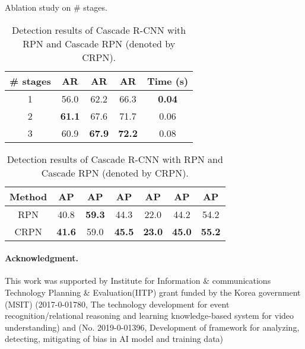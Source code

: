 \documentclass{article}
\begin{document}
	\begin{table}[t]
		\centering
		\begin{minipage}{.45\textwidth}
			\centering
			\scriptsize
			\caption{Ablation study on \# stages.}
			\begin{tabular}{ccccc} \toprule[1pt]
				\# stages & AR         & AR         & AR        & Time (s) \\ \midrule[0.5pt]
				1         & 56.0            & 62.2          & 66.3          & \textbf{0.04}        \\
				2         & \textbf{61.1} & 67.6 & 71.7 & 0.06        \\
				3         & 60.9          & \textbf{67.9}          & \textbf{72.2}          & 0.08        \\ \bottomrule[1pt]
			\end{tabular}
			\label{tab:different_stages}
		\end{minipage}
		\begin{minipage}{0.51\textwidth}
			\centering
			\scriptsize
			\caption{Detection results of Cascade R-CNN with RPN and Cascade RPN (denoted by CRPN).}
			\begin{tabular}{ccccccc} \toprule[1pt]
				Method & AP            & AP        & AP        & AP   & AP   & AP \\ \midrule[0.5pt]
				RPN    & 40.8          & \textbf{59.3}        & 44.3          & 22.0 & 44.2 & 54.2 \\
				CRPN   & \textbf{41.6} & 59.0 & \textbf{45.5} & \textbf{23.0} & \textbf{45.0}   & \textbf{55.2} \\ \bottomrule[1pt]
			\end{tabular}
			\label{tab:crcnn}
		\end{minipage}
		
	\end{table}
	
	\paragraph{Acknowledgment.} This work was supported by Institute for Information \& communications Technology Planning \& Evaluation(IITP) grant funded by the Korea government (MSIT) (2017-0-01780, The technology development for event recognition/relational reasoning and learning knowledge-based system for video understanding) and (No. 2019-0-01396, Development of framework for analyzing, detecting, mitigating of bias in AI model and training data)
	
	{\small
		
		
		
	}
	
\end{document}
